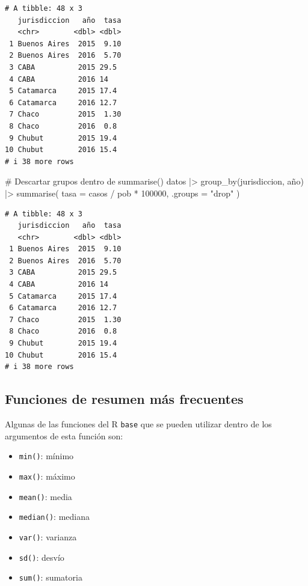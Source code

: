 \documentclass[
  spanish,
  a4paper,
]{scrbook}
\newenvironment{Shaded}{\begin{snugshade}}{\end{snugshade}}
\newcommand{\AttributeTok}[1]{\textcolor[rgb]{0.40,0.45,0.13}{#1}}
\newcommand{\CommentTok}[1]{\textcolor[rgb]{0.37,0.37,0.37}{#1}}
\newcommand{\DecValTok}[1]{\textcolor[rgb]{0.68,0.00,0.00}{#1}}
\newcommand{\FunctionTok}[1]{\textcolor[rgb]{0.28,0.35,0.67}{#1}}
\newcommand{\NormalTok}[1]{\textcolor[rgb]{0.00,0.23,0.31}{#1}}
\newcommand{\SpecialCharTok}[1]{\textcolor[rgb]{0.37,0.37,0.37}{#1}}
\newcommand{\StringTok}[1]{\textcolor[rgb]{0.13,0.47,0.30}{#1}}
\providecommand{\tightlist}{%
  \setlength{\itemsep}{0pt}\setlength{\parskip}{0pt}}
\begin{document}
\begin{verbatim}
# A tibble: 48 x 3
   jurisdiccion   año  tasa
   <chr>        <dbl> <dbl>
 1 Buenos Aires  2015  9.10
 2 Buenos Aires  2016  5.70
 3 CABA          2015 29.5 
 4 CABA          2016 14   
 5 Catamarca     2015 17.4 
 6 Catamarca     2016 12.7 
 7 Chaco         2015  1.30
 8 Chaco         2016  0.8 
 9 Chubut        2015 19.4 
10 Chubut        2016 15.4 
# i 38 more rows
\end{verbatim}

\begin{Shaded}
\begin{Highlighting}[]
\CommentTok{\# Descartar grupos dentro de summarise()}
\NormalTok{datos }\SpecialCharTok{|\textgreater{}}
  \FunctionTok{group\_by}\NormalTok{(jurisdiccion, año) }\SpecialCharTok{|\textgreater{}}
  \FunctionTok{summarise}\NormalTok{(}
    \AttributeTok{tasa =}\NormalTok{ casos }\SpecialCharTok{/}\NormalTok{ pob }\SpecialCharTok{*} \DecValTok{100000}\NormalTok{,}
    \AttributeTok{.groups =} \StringTok{"drop"}
\NormalTok{  )}
\end{Highlighting}
\end{Shaded}

\begin{verbatim}
# A tibble: 48 x 3
   jurisdiccion   año  tasa
   <chr>        <dbl> <dbl>
 1 Buenos Aires  2015  9.10
 2 Buenos Aires  2016  5.70
 3 CABA          2015 29.5 
 4 CABA          2016 14   
 5 Catamarca     2015 17.4 
 6 Catamarca     2016 12.7 
 7 Chaco         2015  1.30
 8 Chaco         2016  0.8 
 9 Chubut        2015 19.4 
10 Chubut        2016 15.4 
# i 38 more rows
\end{verbatim}

\subsection{Funciones de resumen más
frecuentes}\label{funciones-de-resumen-muxe1s-frecuentes}

Algunas de las funciones del R \texttt{base} que se pueden utilizar
dentro de los argumentos de esta función son:

\begin{itemize}
\tightlist
\item
  \texttt{min()}: mínimo
\item
  \texttt{max()}: máximo
\item
  \texttt{mean()}: media
\item
  \texttt{median()}: mediana
\item
  \texttt{var()}: varianza
\item
  \texttt{sd()}: desvío
\item
  \texttt{sum()}: sumatoria
\end{itemize}
\end{document}
